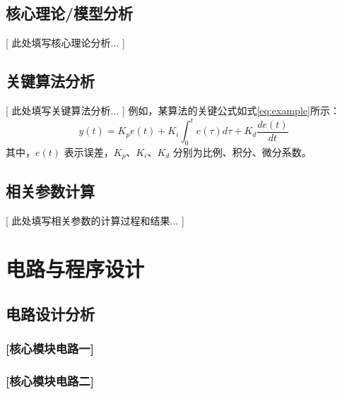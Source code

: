 \documentclass[UTF-8,zihao=-4]{ctexart}
\begin{document}
\subsection{核心理论/模型分析}
    [ 此处填写核心理论分析... ]

\subsection{关键算法分析}
    [ 此处填写关键算法分析... ]
    例如，某算法的关键公式如式\ref{eq:example}所示：
    \begin{equation} \label{eq:example}
        y(t) = K_p e(t) + K_i \int_0^t e(\tau)d\tau + K_d \frac{de(t)}{dt}
    \end{equation}
    其中，$e(t)$ 表示误差，$K_p$、$K_i$、$K_d$ 分别为比例、积分、微分系数。

\subsection{相关参数计算}
    [ 此处填写相关参数的计算过程和结果... ]

\section{电路与程序设计}

\subsection{电路设计分析}

\subsubsection{[核心模块电路一]}

\subsubsection{[核心模块电路二]}
\end{document}

